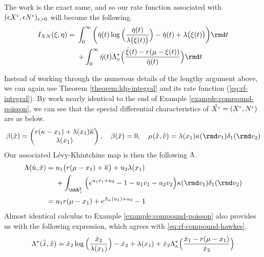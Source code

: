 \begin{example}
\begin{enumerate}
      The work is the exact same, and so our rate function associated with $(\epsilon X^\epsilon, \epsilon N^\epsilon)_{\epsilon>0}$ will become the following.
      \begin{equation}
        \label{eq:rf-compound-hawkes}
          \rf_{\X\N}(\pathVar, \eta) = \begin{aligned}[t]
            &\int_0^\infty \bigg( \dot\eta(t) \log\Big( \frac{\dot\eta(t)}{\affInt\big(\pathVar(t)\big)} \Big) - \dot\eta(t) + \affInt\big(\pathVar(t)\big) \bigg) \rmd t \\
            &+ \int_0^\infty \dot\eta(t) \ode_\affDist^*\Big(\frac{\dot\pathVar(t) - \hawkesRate(\mu-\pathVar(t))}{\dot\eta(t)} \Big) \rmd t
          \end{aligned}
      \end{equation}
  \end{enumerate}
  Instead of working through the numerous details of the lengthy argument above, we can again use Theorem \ref{theorem:ldp-integral} and its rate function (\ref{eq:rf-integral}).
  By work nearly identical to the end of Example \ref{example:compound-poisson}, we can see that the special differential characteristics of $\hat{X^\epsilon} = (X^\epsilon, N^\epsilon)$ are as below.
  \begin{equation*}
    \affDrift(\hat\stateVar) = \begin{pmatrix} \hawkesRate(\kappa - \stateVar_1) + \affInt(\stateVar_1)\overline{\affDist} \\ \affInt(\stateVar_1) \end{pmatrix}, \quad
    \affDrift(\hat\stateVar) = 0, \quad
    \affJump(\hat\stateVar, \hat\markVar) = \affInt(\stateVar_1) \affDist(\rmd\markVar_1) \delta_1(\rmd\markVar_2)
  \end{equation*}
  Our associated L\'evy-Khintchine map is then the following $\Lambda$.
  \begin{align*}
    \ode(\hat\momentVar, \hat\stateVar) 
    &= \begin{aligned}[t]
      &\momentVar_1\big(\hawkesRate(\mu - \stateVar_1) + \overline\affDist\big) + \momentVar_2 \affInt(\stateVar_1) \\
      &+ \int_{\bbR_+^2} \Big( e^{\momentVar_1\markVar_1 + \momentVar_2} - 1 - \momentVar_1\markVar_1 - \momentVar_2\markVar_2 \Big) \affDist(\rmd\markVar_1)\delta_1(\rmd\markVar_2)
    \end{aligned} \\
    &= \momentVar_1 \hawkesRate(\mu-\stateVar_1) + e^{\ode_\affDist(\momentVar_1)+\momentVar_2} - 1
  \end{align*}
  Almost identical calculus to Example \ref{example:compound-poisson} also provides us with the following expression, which agrees with \ref{eq:rf-compound-hawkes}.
  \begin{equation*}
    \Lambda^*(\hat{\dot{x}}, \hat{x}) = \dot{x}_2 \log\Big(\frac{\dot{x}_2}{\lambda(x_1)} \Big) - \dot{x}_2 + \lambda(x_1) + \dot{x}_2 \Lambda_\kappa^*\Big( \frac{\dot{x}_1 - r(\mu - x_1)}{\dot{x}_2} \Big)
  \end{equation*}
\end{example}
